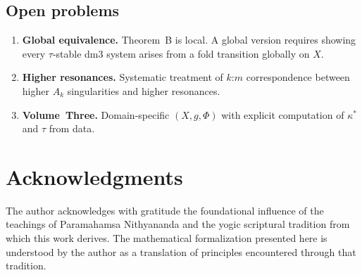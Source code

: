 \documentclass[12pt]{article}
\numberwithin{equation}{section}
\theoremstyle{remark}
\begin{document}
\subsection{Open problems}

\begin{enumerate}[label=(\arabic*)]
  \item \textbf{Global equivalence.} Theorem~B is local.
        A global version requires showing every $\tau$-stable
        dm3 system arises from a fold transition globally on $X$.
  \item \textbf{Higher resonances.} Systematic treatment of
        $k$:$m$ correspondence between higher $A_k$ singularities
        and higher resonances.
  \item \textbf{Volume~Three.} Domain-specific $(X,g,\Phi)$
        with explicit computation of $\kappa^*$ and $\tau$ from
        data.
\end{enumerate}

\section*{Acknowledgments}

The author acknowledges with gratitude the foundational influence
of the teachings of Paramahamsa Nithyananda and the yogic
scriptural tradition from which this work derives. The mathematical
formalization presented here is understood by the author as a
translation of principles encountered through that tradition.
\end{document}

